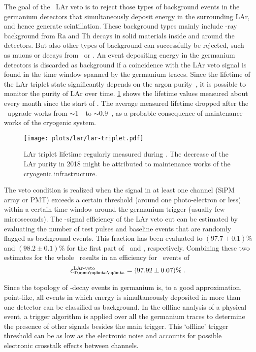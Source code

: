 \newpar
The goal of the \gerda\ LAr veto is to reject those types of background events in the
germanium detectors that simultaneously deposit energy in the surrounding LAr, and hence
generate scintillation. These background types mainly include \g-ray background from Ra
and Th decays in solid materials inside and around the detectors. But also other types of
background can successfully be rejected, such as muons or decays from \Arh\ or \kvz. An
event depositing energy in the germanium detectors is discarded as background if a
coincidence with the LAr veto signal is found in the time window spanned by the germanium
traces.  Since the lifetime of the LAr triplet state significantly depends on the argon
purity~\cite{Amsler2007}, it is possible to monitor the purity of LAr over time.
\cref{fig:lar:triplet-lifetime} shows the lifetime values measured about every month since
the start of \phasetwo. The average measured lifetime dropped after the \phasetwop\
upgrade works from $\sim$1~\mus\ to $\sim$0.9~\mus, as a probable consequence of
maintenance works of the cryogenic system.
\begin{figure}
  \centering
  \texttt{[image: plots/lar/lar-triplet.pdf]}
  \caption{%
    LAr triplet lifetime regularly measured during \phasetwo. The decrease of the LAr
    purity in 2018 might be attributed to maintenance works of the cryogenic
    infrastructure.
  }\label{fig:lar:triplet-lifetime}
\end{figure}
The veto condition is realized when the signal in at least one channel (SiPM array or PMT)
exceeds a certain threshold (around one photo-electron or less) within a certain time
window around the germanium trigger (usually few microseconds). The \onbb-signal
efficiency of the LAr veto cut can be estimated by evaluating the number of test pulses
and baseline events that are randomly flagged as background events. This fraction has been
evaluated to $(97.7 \pm 0.1)$\% and $(98.2 \pm 0.1)$\% for the first part of \phasetwo\
and \phasetwop, respectively. Combining these two estimates for the whole \phasetwo\
results in an efficiency for \onbb\ events of
\[
  \epsilon_\onbbM^\text{LAr-veto} = (97.92 \pm 0.07)\% \;.
\]

Since the topology of \onbb-decay events in germanium is, to a good approximation,
point-like, all events in which energy is simultaneously deposited in more than one
detector can be classified as background. In the offline analysis of a physical event, a
trigger algorithm is applied over all the germanium traces to determine the presence of
other signals besides the main trigger. This `offline' trigger threshold can be as low as
the electronic noise and accounts for possible electronic crosstalk effects between
channels. \fillme{mention AC detectors}


